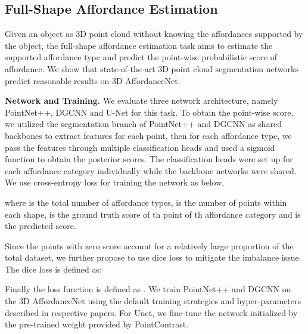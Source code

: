 \documentclass[final]{cvpr}
\begin{document}
\subsection{Full-Shape Affordance Estimation} \label{estimation task}

Given an object as 3D point cloud without knowing the affordances supported by the object, the full-shape affordance estimation task aims to estimate the supported affordance type and predict the point-wise probabilistic score of affordance. We show that state-of-the-art 3D point cloud segmentation networks predict reasonable results on 3D AffordanceNet. 

\noindent\textbf{Network and Training.} {We evaluate three network architecture, namely PointNet++\cite{qi2017pointnet++}, DGCNN\cite{wang2019dynamic} and U-Net\cite{xie2020pointcontrast} for this task.} To obtain the point-wise score, we utilized the segmentation branch of PointNet++ and DGCNN as shared backbones to extract features for each point, then for each affordance type, we pass the features through multiple classification heads and used a sigmoid function to obtain the posterior scores. The classification heads were set up for each affordance category individually while the backbone networks were shared. We use cross-entropy loss  for training the network as below,

where  is the total number of affordance types,  is  the number of points within each shape,  is the ground truth score of th point of th affordance category and  is the predicted score.

Since the points with zero score account for a relatively large proportion of the total dataset, we further propose to use dice loss \cite{milletari2016v} to mitigate the imbalance issue. The dice loss  is defined as:
\vspace{-0.2cm}

Finally the loss function is defined as . {We train PointNet++ and DGCNN on the 3D AffordanceNet using the default training strategies and hyper-parameters described in respective papers\cite{qi2017pointnet++,wang2019dynamic}. For Unet, we fine-tune the network initialized by the pre-trained weight provided by PointContrast\cite{xie2020pointcontrast}.}
\end{document}
